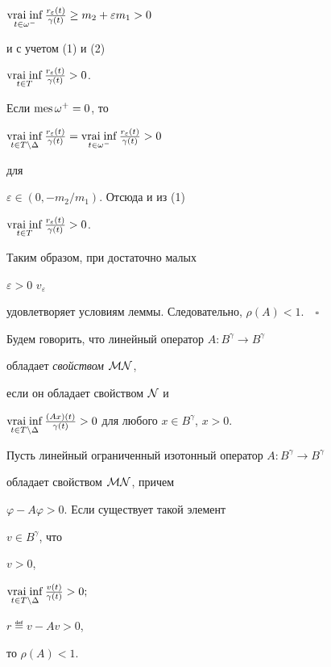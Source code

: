 $\vraiinf\limits_{t\in\omega^-} \frac{r_{\varepsilon}(t)}{\gamma(t)}


\geq m_2 + \varepsilon m_1 >0$


и с учетом (1) и (2)\;


$\vraiinf\limits_{t\in T} \frac{r_{\varepsilon}(t)}{\gamma(t)} >0$.


Если $\operatorname{mes}\omega^+ =0$, то


$\vraiinf\limits_{t\in T\setminus\Delta}


\frac{r_{\varepsilon}(t)}{\gamma(t)} =


\vraiinf\limits_{t\in\omega^-} \frac{r_{\varepsilon}(t)}{\gamma(t)} >0$


для


$\varepsilon\in(0,-m_2/m_1)$. Отсюда и из (1)\;


$\vraiinf\limits_{t\in T} \frac{r_{\varepsilon}(t)}{\gamma(t)} >0$.








Таким образом, при достаточно малых


$\varepsilon>0$\; $v_\varepsilon$


удовлетворяет условиям леммы. Следовательно, $\rho(A)<1.\quad\square$





Будем говорить, что линейный оператор $A:B^\gamma\to B^\gamma$


обладает {\it свойством} $\cal M\cal N$,


если он обладает свойством $\cal N$ и


$\vraiinf\limits_{t\in T\setminus\Delta}


\frac{(Ax)(t)}{\gamma(t)} >0$ для любого $x\in B^\gamma$, $x>0$.





\begin{thm}


Пусть линейный ограниченный изотонный оператор $A:B^\gamma\to B^\gamma$


обладает свойством $\cal M\cal N$, причем


$\varphi-A\varphi >0$. Если существует такой элемент


$v\in B^\gamma$, что


$v>0$,


$\vraiinf\limits_{t\in T\setminus\Delta} \frac{v(t)}{\gamma(t)} >0;$


$r\eqdef v-Av >0$,


то $\rho(A)<1$.


\end{thm}





